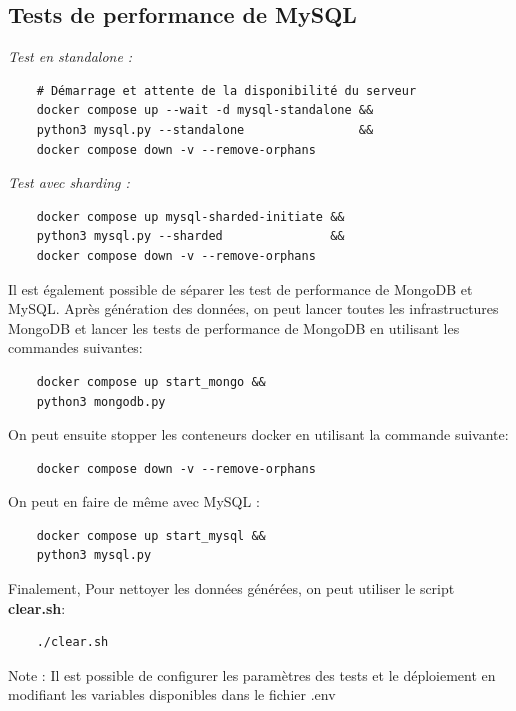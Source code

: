\documentclass[12pt,a4paper]{report}
\begin{document}
\subsection{Tests de performance de MySQL}

\emph{Test en standalone :}

\begin{card}
    \begin{verbatim}
    # Démarrage et attente de la disponibilité du serveur
    docker compose up --wait -d mysql-standalone &&
    python3 mysql.py --standalone                &&
    docker compose down -v --remove-orphans 
\end{verbatim}
\end{card}

\emph{Test avec sharding :}

\begin{card}
    \begin{verbatim}
    docker compose up mysql-sharded-initiate &&
    python3 mysql.py --sharded               &&
    docker compose down -v --remove-orphans
\end{verbatim}
\end{card}

Il est également possible de séparer les test de performance de MongoDB
et MySQL. Après génération des données, on peut lancer toutes les
infrastructures MongoDB et lancer les tests de performance de MongoDB en
utilisant les commandes suivantes:

\begin{card}
    \begin{verbatim}
    docker compose up start_mongo &&
    python3 mongodb.py
    \end{verbatim}
\end{card}

On peut ensuite stopper les conteneurs docker en utilisant la commande
suivante:

\begin{card}
    \begin{verbatim}
    docker compose down -v --remove-orphans
\end{verbatim}
\end{card}

On peut en faire de même avec MySQL :

\begin{card}
    \begin{verbatim}
    docker compose up start_mysql &&
    python3 mysql.py
\end{verbatim}
\end{card}

Finalement, Pour nettoyer les données générées, on peut utiliser le
script \textbf{clear.sh}:

\begin{card}
    \begin{verbatim}
    ./clear.sh
\end{verbatim}
\end{card}

Note : Il est possible de configurer les paramètres des tests et le
déploiement en modifiant les variables disponibles dans le fichier .env
\end{document}
